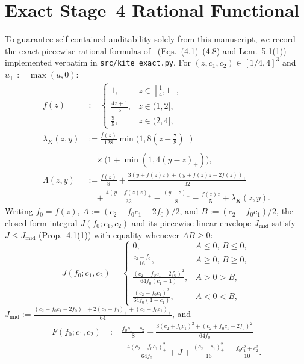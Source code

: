 \documentclass[10pt,twocolumn]{article}
\begin{document}
\section{Exact Stage~4 Rational Functional}\label{sec:stage4}
To guarantee self-contained auditability solely from this manuscript, we record the exact piecewise-rational formulas of~\cite{cogentic2026maximin} (Eqs.~(4.1)--(4.8) and Lem.~5.1(1)) implemented verbatim in \texttt{src/kite\_exact.py}. For $(z,c_1,c_2)\in[1/4,4]^3$ and $u_+ := \max(u,0)$:
\begin{align}
f(z) &:= \begin{cases} 1, & z\in[\tfrac14,1],\\ \tfrac{4z+1}{5}, & z\in(1,2],\\ \tfrac95, & z\in(2,4], \end{cases}\label{eq:gate}\\
\lambda_K(z,y) &:= \tfrac{f(z)}{128}\min\!\big(1,8(z{-}\tfrac78)_+\big)\nonumber\\
&\quad \times\big(1+\min(1,4(y{-}z)_+)\big),\nonumber\\
\Lambda(z,y) &:= \tfrac{f(z)}{8} + \tfrac{3(y+f(z)z)+(y+f(z)z-2f(z))_+}{32}\nonumber\\
&\quad + \tfrac{4(y-f(z)z)_+}{32} - \tfrac{(y-z)_+}{8} - \tfrac{f(z)z}{5} + \lambda_K(z,y).\label{eq:Lambda}
\end{align}
Writing $f_0 = f(z)$, $A := (c_2+f_0 c_1-2f_0)/2$, and $B := (c_2-f_0 c_1)/2$, the closed-form integral $J(f_0;c_1,c_2)$ and its piecewise-linear envelope $J_{\mathrm{mid}}$ satisfy $J \le J_{\mathrm{mid}}$ (Prop.~4.1(1)) with equality whenever $AB \ge 0$:
\begin{equation}
J(f_0;c_1,c_2) = \begin{cases}
0, & A\le 0,\,B\le 0,\\
\frac{c_2-f_0}{16}, & A\ge 0,\,B\ge 0,\\
\frac{(c_2+f_0 c_1-2f_0)^2}{64 f_0(c_1-1)}, & A>0>B,\\
\frac{(c_2-f_0 c_1)^2}{64 f_0(1-c_1)}, & A<0<B,
\end{cases}\label{eq:J}
\end{equation}
$J_{\mathrm{mid}} := \frac{(c_2+f_0 c_1-2f_0)_+ + 2(c_2-f_0)_+ + (c_2-f_0 c_1)_+}{64}$, and
\begin{align}
F(f_0;c_1,c_2) &:= \tfrac{f_0 c_1 - c_2}{8} + \tfrac{3(c_2+f_0 c_1)^2 + (c_2+f_0 c_1-2f_0)_+^2}{64 f_0}\nonumber\\
&\quad - \tfrac{4(c_2-f_0 c_1)_+^2}{64 f_0} + J + \tfrac{(c_2-c_1)_+^2}{16} - \tfrac{f_0 c_1^2 + c_2^2}{10}.\label{eq:F}
\end{align}
\end{document}
